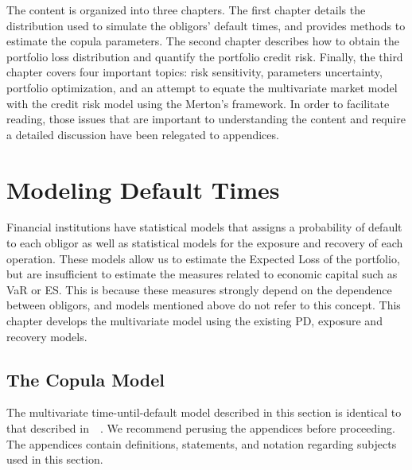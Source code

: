 \documentclass[11pt,fleqn]{book} %
\begin{document}
The content is organized into three chapters. The first chapter details the 
distribution used to simulate the obligors' default times, and provides methods 
to estimate the copula parameters. The second chapter describes how to obtain 
the portfolio loss distribution and quantify the portfolio credit risk.
Finally, the third chapter covers four important topics: risk sensitivity, 
parameters uncertainty, portfolio optimization, and an attempt to equate the 
multivariate market model with the credit risk model using the Merton's framework.
In order to facilitate reading, those issues that are important to understanding 
the content and require a detailed discussion have been relegated to appendices.


\chapter{Modeling Default Times}
\label{chap:mdt}

Financial institutions have statistical models that assigns a probability of 
default to each obligor as well as statistical models for the exposure and 
recovery of each operation. These models allow us to estimate the Expected 
Loss of the portfolio, but are insufficient to estimate the measures related 
to economic capital such as VaR or ES. This is because these measures strongly 
depend on the dependence between obligors, and models mentioned above do not 
refer to this concept. This chapter develops the multivariate model using the 
existing PD, exposure and recovery models.

\section{The Copula Model}

The multivariate time-until-default model described in this section is identical
to that described in~\cite{li:2000,frey:2001}~\cite[chap. 2.6]{bluhm:2002}.
We recommend perusing the appendices before proceeding. The appendices contain 
definitions, statements, and notation regarding subjects used in this section.
\end{document}
